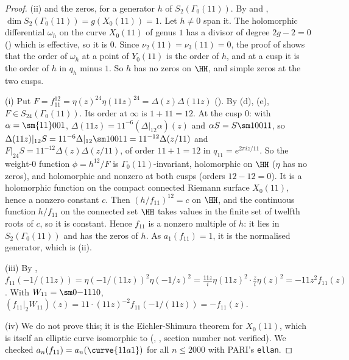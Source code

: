\begin{proof}
(ii) and the zeros, for a generator $h$ of $S_2(\Gamma_0(11))$. By  and , $\dim S_2(\Gamma_0(11))=g(X_0(11))=1$. Let
$h\ne0$ span it. The holomorphic differential $\omega_h$ on the curve $X_0(11)$ of genus $1$ has a divisor of degree $2g-2=0$ () which is effective, so it is $0$.
Since $\nu_2(11)=\nu_3(11)=0$, the proof of  shows that the order of $\omega_h$ at a point of $Y_0(11)$ is the order of $h$, and at a
cusp it is the order of $h$ in $q_h$ minus $1$. So $h$ has no zeros on $\HH$, and simple zeros at the two cusps.

(i) Put $F=f_{11}^{12}=\eta(z)^{24}\eta(11z)^{24}=\Delta(z)\Delta(11z)$ (). By (d), (e), $F\in S_{24}(\Gamma_0(11))$. Its order at $\infty$ is
$1+11=12$. At the cusp $0$: with $\alpha=\sm{11}001$, $\Delta(11z)=11^{-6}(\Delta|_{12}\alpha)(z)$ and $\alpha S=S\sm100{11}$, so $\Delta(11z)|_{12}S=11^{-6}\Delta|_{12}\sm100{11}=11^{-12}\Delta(z/11)$ and
$F|_{24}S=11^{-12}\Delta(z)\Delta(z/11)$, of order $11+1=12$ in $q_{11}=e^{2\pi iz/11}$. So the weight-$0$ function $\phi=h^{12}/F$ is $\Gamma_0(11)$-invariant, holomorphic on $\HH$ ($\eta$
has no zeros), and holomorphic and nonzero at both cusps (orders $12-12=0$). It is a holomorphic function on the compact connected Riemann surface $X_0(11)$, hence a nonzero
constant $c$. Then $(h/f_{11})^{12}=c$ on $\HH$, and the continuous function $h/f_{11}$ on the connected set $\HH$ takes values in the finite set of twelfth roots of $c$, so it is
constant. Hence $f_{11}$ is a nonzero multiple of $h$: it lies in $S_2(\Gamma_0(11))$ and has the zeros of $h$. As $a_1(f_{11})=1$, it is the normalised generator, which is (ii).

(iii) By , $f_{11}(-1/(11z))=\eta(-1/(11z))^2\eta(-1/z)^2=\frac{11z}i\eta(11z)^2\cdot\frac zi\eta(z)^2=-11z^2f_{11}(z)$. With $W_{11}=\sm0{-1}{11}0$,
$(f_{11}|_2W_{11})(z)=11\cdot(11z)^{-2}f_{11}(-1/(11z))=-f_{11}(z)$.

(iv) We do not prove this; it is the Eichler-Shimura theorem for $X_0(11)$, which is itself an elliptic curve isomorphic to  (,
\cite[Section 8.8]{DiamondShurman}, section number not verified). We checked $a_n(f_{11})=a_n(\curve{11a1})$ for all $n\le2000$ with PARI's \texttt{ellan}.
\end{proof}

